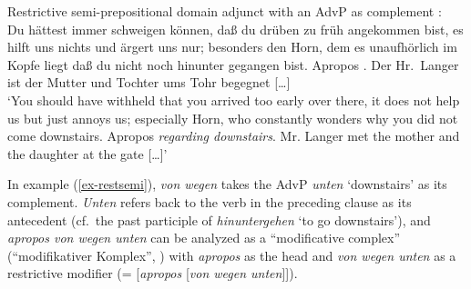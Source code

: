 \documentclass[output=paper
  ,nobabel
  ,draftmode
  ,babelshorthands
  ,colorlinks, citecolor=brown
]{langscibook}
\begin{document}
\eanoraggedright\label{ex-restsemi} Restrictive semi-prepositional domain adjunct with an AdvP as
complement \citep[120–121]{Goethe1767}:\\[2pt]
Du hättest immer schweigen können, daß du drüben zu früh \mbox{angekommen} bist, es hilft uns nichts und ärgert uns nur; besonders den Horn, dem es unaufhörlich im Kopfe liegt daß du nicht noch hinunter gegangen bist. Apropos . Der Hr.\ Langer ist der Mutter und Tochter ums Tohr begegnet [\ldots] \\
	`You should have withheld that you arrived too early over there, it does not help us but just annoys us; especially Horn, who constantly wonders why you did not come downstairs. Apropos \emph{regarding downstairs}. Mr. Langer met the mother and the daughter at the gate [\ldots]'
\z

\noindent
In example (\ref{ex-restsemi}), \emph{von wegen} takes the AdvP \emph{unten} `downstairs' as its complement. \emph{Unten} refers back to the verb in the preceding clause as its antecedent (cf.\ the past participle of \emph{hinuntergehen} `to go downstairs'), and \emph{apropos von wegen unten} can be analyzed as a ``modificative complex'' (``modifikativer Komplex'', \citealp[1167–1172]{Zifonun1997})
with \emph{apropos} as the head and \emph{von wegen unten} as a restrictive modifier (= [\emph{apropos} [\emph{von wegen unten}]]).
\end{document}
